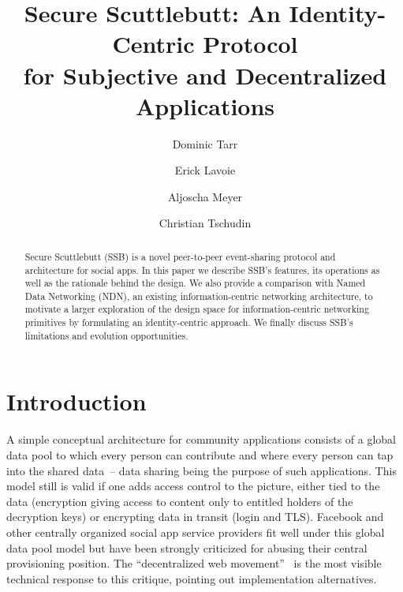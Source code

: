 \documentclass[9pt,sigconf]{acmart}
\title[Secure Scuttlebutt: An Identity-Centric Protocol
       for Subjective and Decentralized Applications]{%
  Secure Scuttlebutt: An Identity-Centric Protocol \\
  for Subjective and Decentralized Applications
}
\author{Dominic Tarr}
\affiliation{ssb:@EMovhfIrFk4NihAKnRNhrf}
\author{Erick Lavoie}
\affiliation{McGill University, Montreal, Canada}
\author{Aljoscha Meyer}
\affiliation{TU Berlin, Germany}
\author{Christian Tschudin}
\affiliation{University of Basel, Switzerland}
\begin{document}

\begin{abstract}
  Secure Scuttlebutt (SSB) is a novel peer-to-peer
  event-sharing protocol and architecture for social apps. In this
  paper we describe SSB's features, its operations as well as the
  rationale behind the design. We also provide a comparison with Named
  Data Networking (NDN), an existing information-centric networking
  architecture, to motivate a larger exploration of the design space
  for information-centric networking primitives by formulating an
  identity-centric approach. We finally discuss SSB's limitations
  and evolution opportunities.


\end{abstract}

\maketitle


\section{Introduction}

A simple conceptual architecture for community applications consists
of a global data pool to which every person can contribute and where
every person can tap into the shared data~-- data sharing being the
purpose of such applications. This model still is valid if one adds
access control to the picture, either tied to the data (encryption
giving access to content only to entitled holders of the decryption
keys) or encrypting data in transit (login and TLS). Facebook and
other centrally organized social app service providers fit well under
this global data pool model but have been strongly criticized for
abusing their central provisioning position.  The ``decentralized web
movement''~\cite{decent-2018-aug} is the most visible technical
response to this critique, pointing out implementation alternatives.
\end{document}
